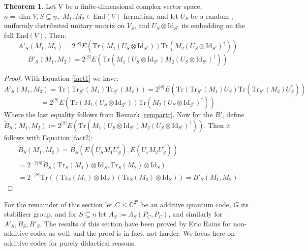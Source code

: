 \documentclass[12pt,a4paper,BCOR15mm,twoside,DIV12]{article}
\def\C{\mathbb{C}}
\def\n{\underline{n}}
\def\End{\text{End}}
\def\Tr{\text{Tr}}
\def\Id{\text{Id}}
\newenvironment{bew}{\begin{proof}[Proof]}{\end{proof}}
\theoremstyle{definition}
\newtheorem{theorem}[Satz]{Theorem}
\begin{document}
\begin{theorem}\label{expectedvalues}%
Let V be a finite-dimensional complex vector space, $n = \dim V, S \subseteq \n,$ $M_1, M_2 \in \End(V)$ hermitian, and let $U_S$ be a random , uniformly distributed unitary matrix on $V_S$, and $U_S \otimes \Id_{S^c}$ its embedding on the full $\End(V)$. Then:
\begin{equation} A'_S(M_1,M_2) = 2^{|S|} E( \Tr(M_1 (U_S \otimes \Id_{S^c})) \Tr(M_2 (U_S \otimes \Id_{S^c})^\dagger )) \end{equation}
\begin{equation} B'_S(M_1,M_2) = 2^{|S|} E( \Tr(M_1 (U_S \otimes \Id_{S^c}) M_2 (U_S \otimes \Id_{S^c})^\dagger)) \end{equation}
\begin{bew}
With Equation \ref{fact1} we have: \begin{equation*} A'_S(M_1, M_2) = \Tr(\Tr_{S^c}(M_1)\Tr_{S^c}(M_2)) = 2^{|S|} E(\Tr(\Tr_{S^c}(M_1) U_S) \Tr( \Tr_{S^c}(M_2) U_S^\dagger)) \end{equation*} \begin{equation*} = 2^{|S|} E(\Tr(M_1 (U_S \otimes \Id_{S^c})) \Tr(M_2 (U_S \otimes \Id_{S^c})^\dagger)) \end{equation*} 
Where the last equality follows from Remark \ref{rempartr}.
Now for the $B'$, define $\tilde B_S(M_1, M_2) :=   2^{|S|} E( \Tr(M_1 (U_S \otimes \Id_{S^c}) M_2 (U_S \otimes \Id_{S^c})^\dagger))$. Then it follows with Equation \ref{fact2}: 
\begin{align*}
\tilde B_S(M_1,M_2) = \tilde B_S( E(U_S M_1 U_S^\dagger), E(U_s M_2 U_S^\dagger)) \\ = 2^{-2|S|} \tilde B_S( \Tr_S(M_1) \otimes \Id_S, \Tr_S(M_2) \otimes \Id_S) 
\\ = 2^{-|S|} \Tr((\Tr_S(M_1) \otimes \Id_S)(\Tr_S(M_2) \otimes \Id_S)) = B'_S(M_1,M_2)\end{align*}
\end{bew}
\end{theorem}



For the remainder of this section let $C \leq \C^{2^n}$ be an additive quantum code, $G$ its stabilizer group, and for $S \subseteq \n$ let $A_S:= A_S(P_C,P_C)$, and similarly for $A'_S, B_S, B'_S$. The results of this section have been proved by Eric Rains \cite{rains} for non-additive codes as well, and the proof is in fact, not harder.
We focus here on additive codes for purely didactical reasons.
\end{document}
